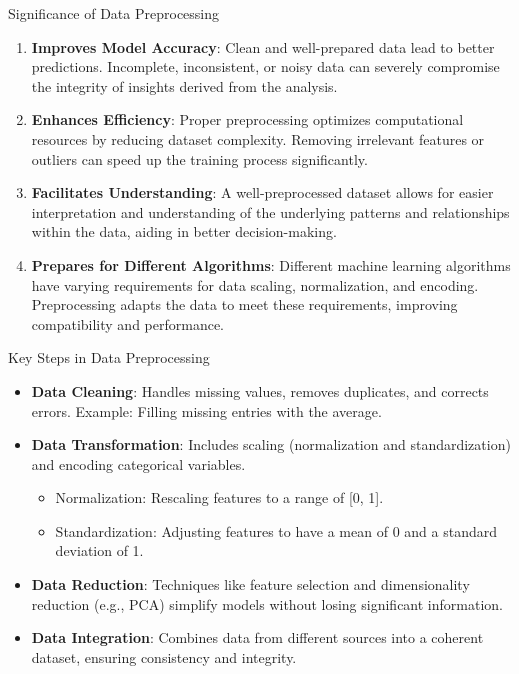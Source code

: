 \documentclass[aspectratio=169]{beamer}
\begin{document}
\begin{frame}[fragile]{Significance of Data Preprocessing}
    \begin{enumerate}
        \item \textbf{Improves Model Accuracy}: Clean and well-prepared data lead to better predictions. Incomplete, inconsistent, or noisy data can severely compromise the integrity of insights derived from the analysis.
        
        \item \textbf{Enhances Efficiency}: Proper preprocessing optimizes computational resources by reducing dataset complexity. Removing irrelevant features or outliers can speed up the training process significantly.
        
        \item \textbf{Facilitates Understanding}: A well-preprocessed dataset allows for easier interpretation and understanding of the underlying patterns and relationships within the data, aiding in better decision-making.
        
        \item \textbf{Prepares for Different Algorithms}: Different machine learning algorithms have varying requirements for data scaling, normalization, and encoding. Preprocessing adapts the data to meet these requirements, improving compatibility and performance.
    \end{enumerate}
\end{frame}

\begin{frame}[fragile]{Key Steps in Data Preprocessing}
    \begin{itemize}
        \item \textbf{Data Cleaning}: Handles missing values, removes duplicates, and corrects errors. Example: Filling missing entries with the average.
        
        \item \textbf{Data Transformation}: Includes scaling (normalization and standardization) and encoding categorical variables.
        \begin{itemize}
            \item Normalization: Rescaling features to a range of [0, 1].
            \item Standardization: Adjusting features to have a mean of 0 and a standard deviation of 1.
        \end{itemize}
        
        \item \textbf{Data Reduction}: Techniques like feature selection and dimensionality reduction (e.g., PCA) simplify models without losing significant information.
        
        \item \textbf{Data Integration}: Combines data from different sources into a coherent dataset, ensuring consistency and integrity.
    \end{itemize}
\end{frame}
\end{document}
